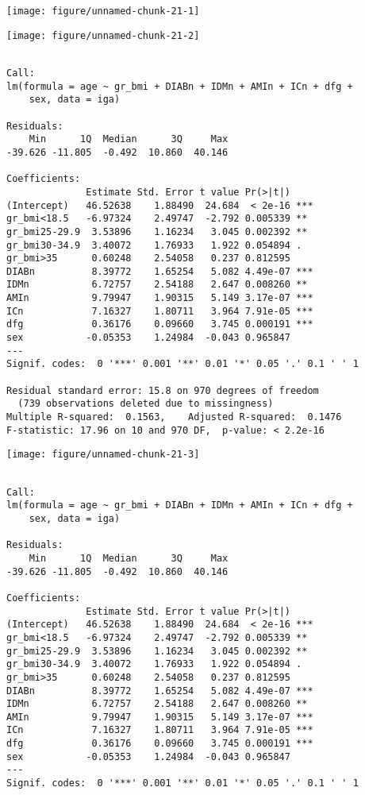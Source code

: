 \documentclass[11pt,a4paper]{article}\usepackage[]{graphicx}\usepackage[]{color}
\makeatletter
\def\maxwidth{ %
  \ifdim\Gin@nat@width>\linewidth
    \linewidth
  \else
    \Gin@nat@width
  \fi
}
\newenvironment{kframe}{%
 \def\at@end@of@kframe{}%
 \ifinner\ifhmode%
  \def\at@end@of@kframe{\end{minipage}}%
  \begin{minipage}{\columnwidth}%
 \fi\fi%
 \def\FrameCommand##1{\hskip\@totalleftmargin \hskip-\fboxsep
 \colorbox{shadecolor}{##1}\hskip-\fboxsep
     \hskip-\linewidth \hskip-\@totalleftmargin \hskip\columnwidth}%
 \MakeFramed {\advance\hsize-\width
   \@totalleftmargin\z@ \linewidth\hsize
   \@setminipage}}%
 {\par\unskip\endMakeFramed%
 \at@end@of@kframe}
\newenvironment{knitrout}{}{} %
\makeatother
\begin{document}
\begin{knitrout}
\color{fgcolor}
\texttt{[image: figure/unnamed-chunk-21-1]} 

\texttt{[image: figure/unnamed-chunk-21-2]} 
\begin{kframe}\begin{verbatim}

Call:
lm(formula = age ~ gr_bmi + DIABn + IDMn + AMIn + ICn + dfg + 
    sex, data = iga)

Residuals:
    Min      1Q  Median      3Q     Max 
-39.626 -11.805  -0.492  10.860  40.146 

Coefficients:
              Estimate Std. Error t value Pr(>|t|)    
(Intercept)   46.52638    1.88490  24.684  < 2e-16 ***
gr_bmi<18.5   -6.97324    2.49747  -2.792 0.005339 ** 
gr_bmi25-29.9  3.53896    1.16234   3.045 0.002392 ** 
gr_bmi30-34.9  3.40072    1.76933   1.922 0.054894 .  
gr_bmi>35      0.60248    2.54058   0.237 0.812595    
DIABn          8.39772    1.65254   5.082 4.49e-07 ***
IDMn           6.72757    2.54188   2.647 0.008260 ** 
AMIn           9.79947    1.90315   5.149 3.17e-07 ***
ICn            7.16327    1.80711   3.964 7.91e-05 ***
dfg            0.36176    0.09660   3.745 0.000191 ***
sex           -0.05353    1.24984  -0.043 0.965847    
---
Signif. codes:  0 '***' 0.001 '**' 0.01 '*' 0.05 '.' 0.1 ' ' 1

Residual standard error: 15.8 on 970 degrees of freedom
  (739 observations deleted due to missingness)
Multiple R-squared:  0.1563,	Adjusted R-squared:  0.1476 
F-statistic: 17.96 on 10 and 970 DF,  p-value: < 2.2e-16
\end{verbatim}
\end{kframe}
\texttt{[image: figure/unnamed-chunk-21-3]} 
\begin{kframe}\begin{verbatim}

Call:
lm(formula = age ~ gr_bmi + DIABn + IDMn + AMIn + ICn + dfg + 
    sex, data = iga)

Residuals:
    Min      1Q  Median      3Q     Max 
-39.626 -11.805  -0.492  10.860  40.146 

Coefficients:
              Estimate Std. Error t value Pr(>|t|)    
(Intercept)   46.52638    1.88490  24.684  < 2e-16 ***
gr_bmi<18.5   -6.97324    2.49747  -2.792 0.005339 ** 
gr_bmi25-29.9  3.53896    1.16234   3.045 0.002392 ** 
gr_bmi30-34.9  3.40072    1.76933   1.922 0.054894 .  
gr_bmi>35      0.60248    2.54058   0.237 0.812595    
DIABn          8.39772    1.65254   5.082 4.49e-07 ***
IDMn           6.72757    2.54188   2.647 0.008260 ** 
AMIn           9.79947    1.90315   5.149 3.17e-07 ***
ICn            7.16327    1.80711   3.964 7.91e-05 ***
dfg            0.36176    0.09660   3.745 0.000191 ***
sex           -0.05353    1.24984  -0.043 0.965847    
---
Signif. codes:  0 '***' 0.001 '**' 0.01 '*' 0.05 '.' 0.1 ' ' 1


\end{verbatim}
\end{kframe}
\end{knitrout}
\end{document}
